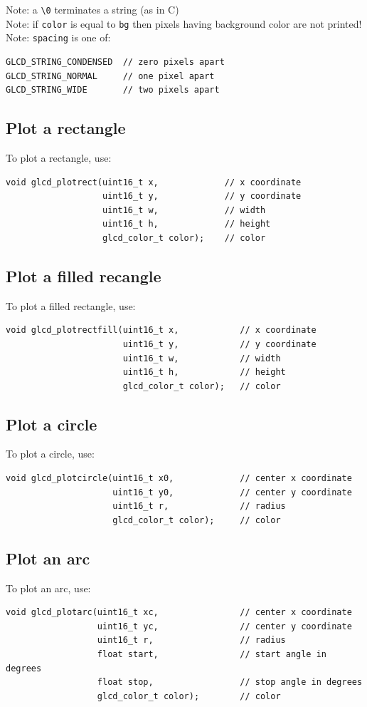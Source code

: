 \documentclass[12pt]{article}
\begin{document}
Note: a \lstinline|\0| terminates a string (as in C)\\
Note: if \lstinline|color| is equal to \lstinline|bg| then pixels having background color are not printed! 
Note: \lstinline|spacing| is one of:
\begin{lstlisting}
GLCD_STRING_CONDENSED  // zero pixels apart
GLCD_STRING_NORMAL     // one pixel apart
GLCD_STRING_WIDE       // two pixels apart
\end{lstlisting}

\subsection{Plot a rectangle}
To plot a rectangle, use:
\begin{lstlisting}
void glcd_plotrect(uint16_t x,             // x coordinate
                   uint16_t y,             // y coordinate
                   uint16_t w,             // width
                   uint16_t h,             // height
                   glcd_color_t color);    // color
\end{lstlisting}

\subsection{Plot a filled recangle}
To plot a filled rectangle, use:
\begin{lstlisting}
void glcd_plotrectfill(uint16_t x,            // x coordinate
                       uint16_t y,            // y coordinate
                       uint16_t w,            // width
                       uint16_t h,            // height
                       glcd_color_t color);   // color
\end{lstlisting}

\subsection{Plot a circle}
To plot a circle, use:
\begin{lstlisting}
void glcd_plotcircle(uint16_t x0,             // center x coordinate
                     uint16_t y0,             // center y coordinate
                     uint16_t r,              // radius
                     glcd_color_t color);     // color
\end{lstlisting}

\subsection{Plot an arc}
To plot an arc, use:
\begin{lstlisting}
void glcd_plotarc(uint16_t xc,                // center x coordinate
                  uint16_t yc,                // center y coordinate
                  uint16_t r,                 // radius
                  float start,                // start angle in degrees
                  float stop,                 // stop angle in degrees
                  glcd_color_t color);        // color
\end{lstlisting}
\end{document}
